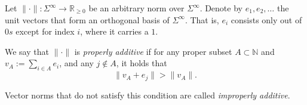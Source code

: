 \begin{definition}
	\label{def:properly-additive-vector-norms}
	Let $\lVert \cdot \rVert:\Sigma^{\infty}\to\mathbb{R}_{\geq 0}$ be an arbitrary norm over $\Sigma^{\infty}$.
	Denote by $e_1,e_2,\dots$ the unit vectors that form an orthogonal basis of $\Sigma^{\infty}$. That is, $e_i$ consists only out of $0s$ except for index $i$, where it carries a $1$.

	We say that $\lVert \cdot \rVert$ is \textit{properly additive} if for any proper subset $A\subset \mathbb{N}$ and $v_A:=\sum_{i\in A}e_i$, and any $j\notin A$, it holds that
	\begin{equation}
		\lVert v_A + e_j \rVert > \lVert v_A \rVert.
	\end{equation}
	
	Vector norms that do not satisfy this condition are called \textit{improperly additive}.
\end{definition}

